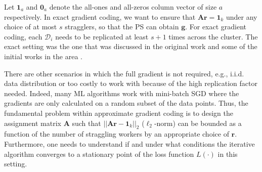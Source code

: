 \documentclass[journal,draftcls,onecolumn]{IEEEtran}
\theoremstyle{mystyle}
\newcommand{\calD}{\mathcal{D}}
\newcommand{\aditya}[1]{\marginpar{+}{\bf Aditya's remark}: {\em #1}}
\begin{document}
Let $\mathbf{1}_a$ and $\mathbf{0}_a$ denote the all-ones and all-zeros column vector of size $a$ respectively. In exact gradient coding, we want to ensure that $\mathbf{A}\mathbf{r} = \mathbf{1}_k$ under any choice of at most $s$ stragglers, so that the PS can obtain $\mathbf{g}$. For exact gradient coding, each $\calD_i$ needs to be replicated at least $s+1$ times across the cluster.
The exact setting was the one that was discussed in the original work \cite{tandon_gradient} and some of the initial works in the area \cite{dimakis_cyclic_mds,reedsolomon_GC18,10.5555/3327345.3327412,tieredGC20,dynamicClusteringGC23,numerically_stableGC20}. %

 There are other scenarios in which the full gradient is not required, e.g., i.i.d. data distribution or too costly to work with because of the high replication factor needed. Indeed, many ML algorithms work with mini-batch SGD \cite{bottou_optimization} where the gradients are only calculated on a random subset of the data points. %
Thus, the fundamental problem within approximate gradient coding \cite{dimakis_cyclic_mds, charles2017approximate,wang2019fundamental} is to design the assignment matrix $\mathbf{A}$ such that $|| \mathbf{A} \mathbf{r}- \mathbf{1}_k||_2$ ($\ell_2$-norm) can be bounded as a function of the number of straggling workers by an appropriate choice of $\mathbf{r}$. Furthermore, one needs to understand if and under what conditions the iterative algorithm converges to a stationary point of the loss function $L(\cdot)$ in this setting. %

\end{document}
